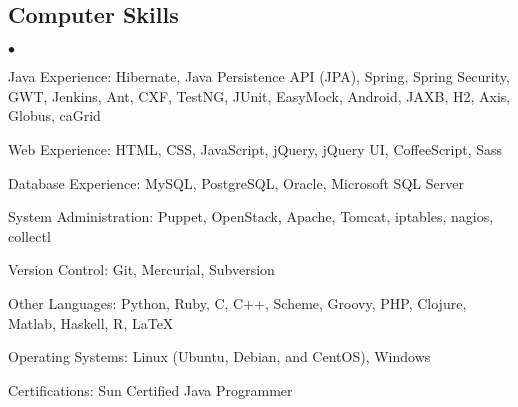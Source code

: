 \documentclass[margin,line]{res}
\newenvironment{list2}{
  \begin{list}{$\bullet$}{%
      \setlength{\itemsep}{0in}
      \setlength{\parsep}{0in} \setlength{\parskip}{0in}
      \setlength{\topsep}{0in} \setlength{\partopsep}{0in} 
      \setlength{\leftmargin}{0.2in}}}{\end{list}}
\begin{document}
\begin{resume}
\section{\sc Computer Skills} 
\begin{list2}
\item Java Experience: Hibernate, Java Persistence API (JPA), Spring, Spring Security, GWT, Jenkins, Ant,
CXF, TestNG, JUnit, EasyMock, Android, JAXB, H2, Axis, Globus, caGrid
\item Web Experience: HTML, CSS, JavaScript, jQuery, jQuery UI, CoffeeScript, Sass
\item Database Experience: MySQL, PostgreSQL, Oracle, Microsoft SQL Server
\item System Administration: Puppet, OpenStack, Apache, Tomcat, iptables, nagios, collectl
\item Version Control: Git, Mercurial, Subversion
\item Other Languages: Python, Ruby, C, C++, Scheme, Groovy, PHP, Clojure, Matlab, Haskell, R, \LaTeX
\item Operating Systems: Linux (Ubuntu, Debian, and CentOS), Windows
\item Certifications: Sun Certified Java Programmer
%
\end{list2}

\end{resume}
\end{document}
